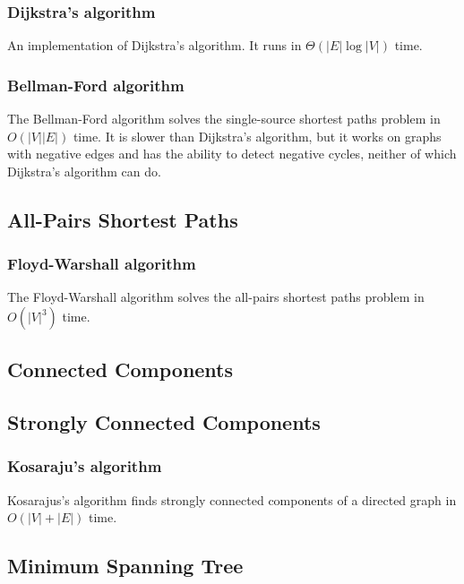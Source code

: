 \documentclass[10pt,a4paper,titlepage]{article}
\begin{document}
\subsubsection{Dijkstra's algorithm}
An implementation of Dijkstra's algorithm. It runs in $\Theta(|E|\log{|V|})$ time.


\subsubsection{Bellman-Ford algorithm}
The Bellman-Ford algorithm solves the single-source shortest paths problem in $O(|V||E|)$ time. It is slower than Dijkstra's algorithm, but it works on graphs with negative edges and has the ability to detect negative cycles, neither of which Dijkstra's algorithm can do.

\subsection{All-Pairs Shortest Paths}
\subsubsection{Floyd-Warshall algorithm}
The Floyd-Warshall algorithm solves the all-pairs shortest paths problem in $O(|V|^3)$ time.

\subsection{Connected Components}
\subsection{Strongly Connected Components}
\subsubsection{Kosaraju's algorithm}
Kosarajus's algorithm finds strongly connected components of a directed graph in $O(|V|+|E|)$ time.

\subsection{Minimum Spanning Tree}
\end{document}
